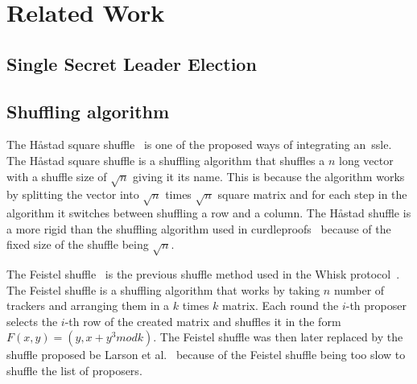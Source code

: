 \section{Related Work}\label{sec:related-work}




\subsection{Single Secret Leader Election}\label{sec:related-work-SSLE}




\subsection{Shuffling algorithm}\label{sec:related-work-Shuffling-algorithm}

The Håstad square shuffle~\cite{haastad2006square} is one of the proposed ways of integrating an~\gls{ssle}.
The Håstad square shuffle is a shuffling algorithm that shuffles a $n$ long vector with a shuffle size of $\sqrt {n}$ giving it its name.
This is because the algorithm works by splitting the vector into $\sqrt {n}$ times $\sqrt {n}$ square matrix and for each step in the algorithm it switches between shuffling a row and a column.
The Håstad shuffle is a more rigid than the shuffling algorithm used in curdleproofs~\cite{cryptoeprint:2022/560} because of the fixed size of the shuffle being $\sqrt {n}$.

The Feistel shuffle~\cite{Feistle} is the previous shuffle method used in the Whisk protocol~\cite{Whisk2024}.
The Feistel shuffle is a shuffling algorithm that works by taking $n$ number of trackers and arranging them in a $k$ times $k$ matrix.
Each round the $i$-th proposer selects the $i$-th row of the created matrix and shuffles it in the form $F(x,y)=(y,x+y^3 mod k)$.
The Feistel shuffle was then later replaced by the shuffle proposed be Larson et al.~\cite{cryptoeprint:2022/560} because of the Feistel shuffle being too slow to shuffle the list of proposers.


